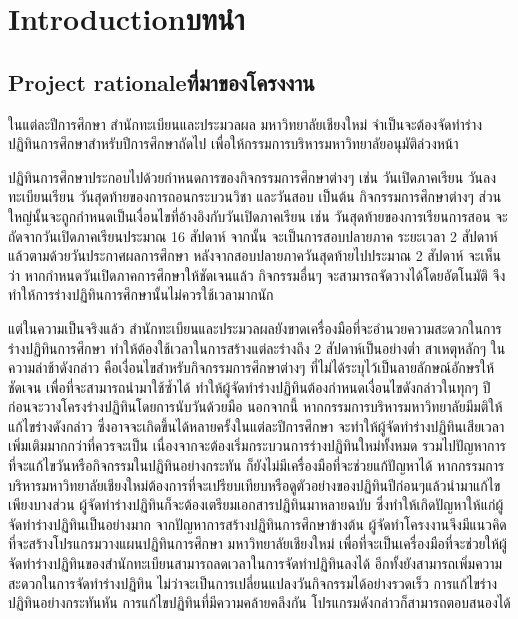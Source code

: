 
\chapter{\ifenglish Introduction\else บทนำ\fi}

\section{\ifenglish Project rationale\else ที่มาของโครงงาน\fi}
ในแต่ละปีการศึกษา สำนักทะเบียนและประมวลผล มหาวิทยาลัยเชียงใหม่ จำเป็นจะต้องจัดทำร่างปฏิทินการศึกษาสำหรับปีการศึกษาถัดไป เพื่อให้กรรมการบริหารมหาวิทยาลัยอนุมัติล่วงหน้า

ปฏิทินการศึกษาประกอบไปด้วยกำหนดการของกิจกรรมการศึกษาต่างๆ เช่น วันเปิดภาคเรียน วันลงทะเบียนเรียน วันสุดท้ายของการถอนกระบวนวิชา และวันสอบ เป็นต้น
%
กิจกรรมการศึกษาต่างๆ ส่วนใหญ่นั้นจะถูกกำหนดเป็นเงื่อนไขที่อ้างอิงกับวันเปิดภาคเรียน เช่น วันสุดท้ายของการเรียนการสอน จะถัดจากวันเปิดภาคเรียนประมาณ 16 สัปดาห์ จากนั้น จะเป็นการสอบปลายภาค ระยะเวลา 2 สัปดาห์ แล้วตามด้วยวันประกาศผลการศึกษา หลังจากสอบปลายภาควันสุดท้ายไปประมาณ 2 สัปดาห์
%
จะเห็นว่า หากกำหนดวันเปิดภาคการศึกษาให้ชัดเจนแล้ว กิจกรรมอื่นๆ จะสามารถจัดวางได้โดยอัตโนมัติ จึงทำให้การร่างปฏิทินการศึกษานั้นไม่ควรใช้เวลามากนัก

แต่ในความเป็นจริงแล้ว สำนักทะเบียนและประมวลผลยังขาดเครื่องมือที่จะอำนวยความสะดวกในการร่างปฏิทินการศึกษา ทำให้ต้องใช้เวลาในการสร้างแต่ละร่างถึง 2 สัปดาห์เป็นอย่างต่ำ
%
สาเหตุหลักๆ ในความล่าช้าดังกล่าว คือเงื่อนไขสำหรับกิจกรรมการศึกษาต่างๆ ที่ไม่ได้ระบุไว้เป็นลายลักษณ์อักษรให้ชัดเจน เพื่อที่จะสามารถนำมาใช้ซ้ำได้ ทำให้ผู้จัดทำร่างปฏิทินต้องกำหนดเงื่อนไขดังกล่าวในทุกๆ ปี ก่อนจะวางโครงร่างปฏิทินโดยการนับวันด้วยมือ
%
นอกจากนี้ หากกรรมการบริหารมหาวิทยาลัยมีมติให้แก้ไขร่างดังกล่าว ซึ่งอาจจะเกิดขึ้นได้หลายครั้งในแต่ละปีการศึกษา จะทำให้ผู้จัดทำร่างปฏิทินเสียเวลาเพิ่มเติมมากกว่าที่ควรจะเป็น เนื่องจากจะต้องเริ่มกระบวนการร่างปฏิทินใหม่ทั้งหมด
%
รวมไปปัญหาการที่จะแก้ไขวันหรือกิจกรรมในปฏิทินอย่างกระทัน ก็ยังไม่มีเครื่องมือที่จะช่วยแก้ปัญหาได้ หากกรรมการบริหารมหาวิทยาลัยเชียงใหม่ต้องการที่จะเปรียบเทียบหรือดูตัวอย่างของปฏิทินปีก่อนๆแล้วนำมาแก้ไขเพียงบางส่วน ผู้จัดทำร่างปฏิทินก็จะต้องเตรียมเอกสารปฏิทินมาหลายฉบับ ซึ่งทำให้เกิดปัญหาให้แก่ผู้จัดทำร่างปฏิทินเป็นอย่างมาก
%
จากปัญหาการสร้างปฏิทินการศึกษาข้างต้น ผู้จัดทำโครงงานจึงมีแนวคิดที่จะสร้างโปรแกรมวางแผนปฏิทินการศึกษา มหาวิทยาลัยเชียงใหม่  
%
เพื่อที่จะเป็นเครื่องมือที่จะช่วยให้ผู้จัดทำร่างปฏิทินของสำนักทะเบียนสามารถลดเวลาในการจัดทำปฏิทินลงได้
%
อีกทั้งยังสามารถเพิ่มความสะดวกในการจัดทำร่างปฏิทิน ไม่ว่าจะเป็นการเปลี่ยนแปลงวันกิจกรรมได้อย่างรวดเร็ว การแก้ไขร่างปฏิทินอย่างกระทันหัน การแก้ไขปฏิทินที่มีความคล้ายคลึงกัน โปรแกรมดังกล่าวก็สามารถตอบสนองได้ 

